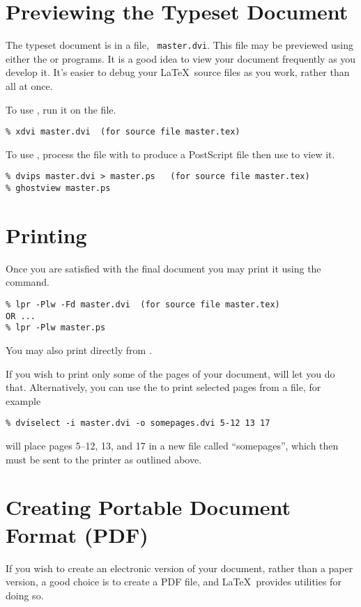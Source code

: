 \section{Previewing the Typeset Document}
The typeset document is in a  file, \eg\ \verb=master.dvi=.
This file may be previewed using either the  or  programs.
It is a good idea to view your document frequently as you develop it.
It's easier to debug your \LaTeX\ source files as you work, rather than all at once.

To use , run it on the  file.
\begin{verbatim}
% xdvi master.dvi  (for source file master.tex)
\end{verbatim}

To use , process the  file with  to produce a PostScript file then use  to view it.
\begin{verbatim}
% dvips master.dvi > master.ps   (for source file master.tex)
% ghostview master.ps
\end{verbatim}
\section{Printing}
Once you are satisfied with the final document you may print it using the  command.
\begin{verbatim}
% lpr -Plw -Fd master.dvi  (for source file master.tex)
OR ...
% lpr -Plw master.ps
\end{verbatim}
You may also print directly from .

If you wish to print only some of the pages of your document,  will let you do that.
Alternatively, you can use the  to print selected pages from a  file, for example
\begin{verbatim}
% dviselect -i master.dvi -o somepages.dvi 5-12 13 17
\end{verbatim}
will place pages 5--12, 13, and 17 in a new  file called ``somepages'', which then must be sent to the printer as outlined above.
\section{Creating Portable Document Format (PDF)}
If you wish to create an electronic version of your document,
rather than a paper version, a good choice is to create a PDF file, and \LaTeX\ provides utilities for doing so.

